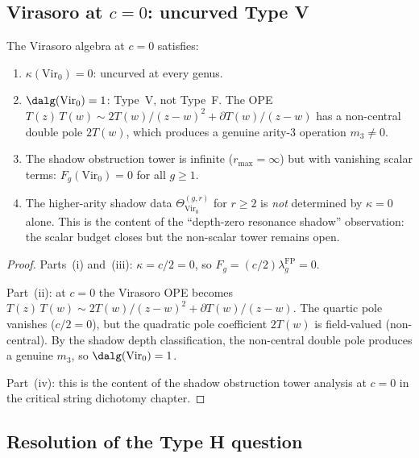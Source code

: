 \documentclass[11pt]{article}
\begin{document}
\subsection{Virasoro at $c = 0$: uncurved Type V}

\begin{proposition}
\label{prop:vir-0-uncurved}
The Virasoro algebra at $c = 0$ satisfies:
\begin{enumerate}[label=\textup{(\roman*)}]
\item $\kappa(\mathrm{Vir}_0) = 0$: uncurved at every genus.
\item $\dalg(\mathrm{Vir}_0) = 1$: Type~V, not Type~F.
  The OPE $T(z)\,T(w) \sim 2T(w)/(z-w)^2 + \partial T(w)/(z-w)$
  has a non-central double pole $2T(w)$, which produces
  a genuine arity-$3$ operation $m_3 \neq 0$.
\item The shadow obstruction tower is infinite ($r_{\max} = \infty$)
  but with vanishing scalar terms: $F_g(\mathrm{Vir}_0) = 0$
  for all $g \geq 1$.
\item The higher-arity shadow data
  $\Theta^{(g,r)}_{\mathrm{Vir}_0}$ for $r \geq 2$ is
  \emph{not} determined by $\kappa = 0$ alone.
  This is the content of the ``depth-zero resonance shadow''
  observation: the scalar budget closes but the non-scalar
  tower remains open.
\end{enumerate}
\end{proposition}

\begin{proof}
Parts~(i) and~(iii): $\kappa = c/2 = 0$, so
$F_g = (c/2)\lambda_g^{\mathrm{FP}} = 0$.

Part~(ii): at $c = 0$ the Virasoro OPE becomes
$T(z)\,T(w) \sim 2T(w)/(z-w)^2 + \partial T(w)/(z-w)$.
The quartic pole vanishes ($c/2 = 0$), but the
quadratic pole coefficient $2T(w)$ is field-valued
(non-central).  By the shadow depth classification, the
non-central double pole produces a genuine $m_3$, so
$\dalg(\mathrm{Vir}_0) = 1$.

Part~(iv): this is the content of the shadow obstruction tower analysis
at $c = 0$ in the critical string dichotomy chapter.
\end{proof}

\subsection{Resolution of the Type H question}
\end{document}
